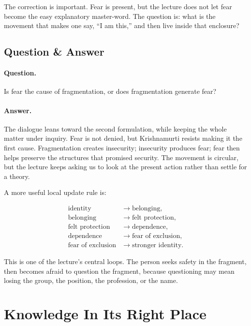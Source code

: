 The correction is important. Fear is present, but the lecture does not let fear become the easy explanatory master-word. The question is: what is the movement that makes one say, ``I am this,'' and then live inside that enclosure?

\subsection{Question \& Answer}

\paragraph{Question.}
Is fear the cause of fragmentation, or does fragmentation generate fear?

\paragraph{Answer.}
The dialogue leans toward the second formulation, while keeping the whole matter under inquiry. Fear is not denied, but Krishnamurti resists making it the first cause. Fragmentation creates insecurity; insecurity produces fear; fear then helps preserve the structures that promised security. The movement is circular, but the lecture keeps asking us to look at the present action rather than settle for a theory.

A more useful local update rule is:

\begin{align}
\text{identity} &\longrightarrow \text{belonging}, \\
\text{belonging} &\longrightarrow \text{felt protection}, \\
\text{felt protection} &\longrightarrow \text{dependence}, \\
\text{dependence} &\longrightarrow \text{fear of exclusion}, \\
\text{fear of exclusion} &\longrightarrow \text{stronger identity}.
\end{align}

This is one of the lecture's central loops. The person seeks safety in the fragment, then becomes afraid to question the fragment, because questioning may mean losing the group, the position, the profession, or the name.

\section{Knowledge In Its Right Place}

